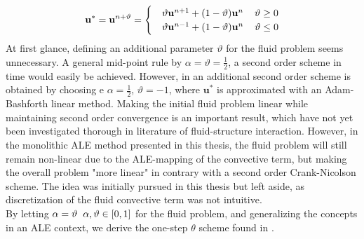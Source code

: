 \begin{align*}
\mathbf{u}^{*} =   \mathbf{u}^{n+ \vartheta} =
\begin{cases} 
   &\vartheta \mathbf{u}^{n+1} + (1 - \vartheta)\mathbf{u}^{n} \hspace{4mm} \vartheta \geq 0 \\ 
   &\vartheta \mathbf{u}^{n-1} + (1 - \vartheta)\mathbf{u}^{n} \hspace{4mm} \vartheta \leq 0
   \end{cases}
\end{align*}
At first glance, defining an additional parameter $\vartheta$ for the fluid problem seems unnecessary. A general mid-point rule by  $\alpha = \vartheta = \frac{1}{2}$, a second order scheme in time would easily be achieved. However, in \cite{Simo1994} an additional second order scheme is obtained by choosing e $\alpha = \frac{1}{2}$,  $\vartheta =-1$, where  $\mathbf{u}^{*}$ is approximated with an Adam-Bashforth linear method. Making the initial fluid problem linear while maintaining second order convergence is an important result, which have not yet been investigated thorough in literature of fluid-structure interaction.  However, in the monolithic  ALE method presented in this thesis, the fluid problem will still remain non-linear due to the ALE-mapping of the convective term, but making the overall problem "more linear" in contrary with a second order Crank-Nicolson scheme. The idea was initially pursued in this thesis but left aside, as discretization of the fluid convective term was not intuitive.  \\

By letting $\alpha = \vartheta \hspace{2mm} \alpha, \vartheta \in [0, 1] $ for the fluid problem, and generalizing the concepts in an ALE context, we derive the one-step $\theta$ scheme found in \cite{Wicka}.

